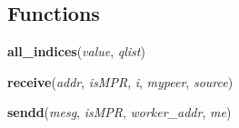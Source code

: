 
  \subsection{Functions}

    \label{olsr:all_indices}

    \vspace{0.5ex}

\hspace{.8\funcindent}\begin{boxedminipage}{\funcwidth}

    \raggedright \textbf{all\_indices}(\textit{value}, \textit{qlist})

\setlength{\parskip}{2ex}
\setlength{\parskip}{1ex}
    \end{boxedminipage}

    \label{olsr:receive}

    \vspace{0.5ex}

\hspace{.8\funcindent}\begin{boxedminipage}{\funcwidth}

    \raggedright \textbf{receive}(\textit{addr}, \textit{isMPR}, \textit{i}, \textit{mypeer}, \textit{source})

\setlength{\parskip}{2ex}
\setlength{\parskip}{1ex}
    \end{boxedminipage}

    \label{olsr:sendd}

    \vspace{0.5ex}

\hspace{.8\funcindent}\begin{boxedminipage}{\funcwidth}

    \raggedright \textbf{sendd}(\textit{mesg}, \textit{isMPR}, \textit{worker\_addr}, \textit{me})

\setlength{\parskip}{2ex}
\setlength{\parskip}{1ex}
    \end{boxedminipage}


